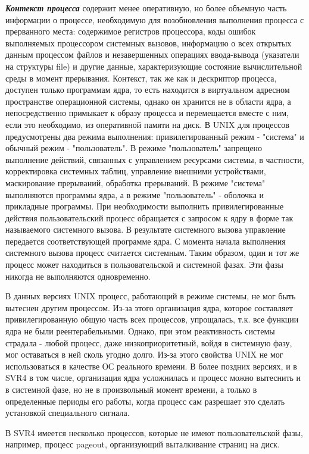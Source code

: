 \textbf{\textit{Контекст процесса }} содержит менее оперативную, но более объемную часть информации о процессе, необходимую для возобновления выполнения процесса с прерванного места: содержимое регистров процессора, коды ошибок выполняемых процессором системных вызовов, информацию о всех открытых данным процессом файлов и незавершенных операциях ввода-вывода (указатели на структуры file) и другие данные, характеризующие состояние вычислительной среды в момент прерывания. Контекст, так же как и дескриптор процесса, доступен только программам ядра, то есть находится в виртуальном адресном пространстве операционной системы, однако он хранится не в области ядра, а непосредственно примыкает к образу процесса и перемещается вместе с ним, если это необходимо, из оперативной памяти на диск. В UNIX для процессов предусмотрены два режима выполнения: привилегированный режим - "система" и обычный режим - "пользователь". В режиме "пользователь" запрещено выполнение действий, связанных с управлением ресурсами системы, в частности, корректировка системных таблиц, управление внешними устройствами, маскирование прерываний, обработка прерываний. В режиме "система" выполняются программы ядра, а в режиме "пользователь" - оболочка и прикладные программы. При необходимости выполнить привилегированные действия пользовательский процесс обращается с запросом к ядру в форме так называемого системного вызова. В результате системного вызова управление передается соответствующей программе ядра. С момента начала выполнения системного вызова процесс считается системным. Таким образом, один и тот же процесс может находиться в пользовательской и системной фазах. Эти фазы никогда не выполняются одновременно.

В данных версиях UNIX процесс, работающий в режиме системы, не мог быть вытеснен другим процессом. Из-за этого организация ядра, которое составляет привилегированную общую часть всех процессов, упрощалась, т.к. все функции ядра не были реентерабельными. Однако, при этом реактивность системы страдала - любой процесс, даже низкоприоритетный, войдя в системную фазу, мог оставаться в ней сколь угодно долго. Из-за этого свойства UNIX не мог использоваться в качестве ОС реального времени. В более поздних версиях, и в SVR4 в том числе, организация ядра усложнилась и процесс можно вытеснить и в системной фазе, но не в произвольный момент времени, а только в определенные периоды его работы, когда процесс сам разрешает это сделать установкой специального сигнала.

В SVR4 имеется несколько процессов, которые не имеют пользовательской фазы, например, процесс pageout, организующий выталкивание страниц на диск.

